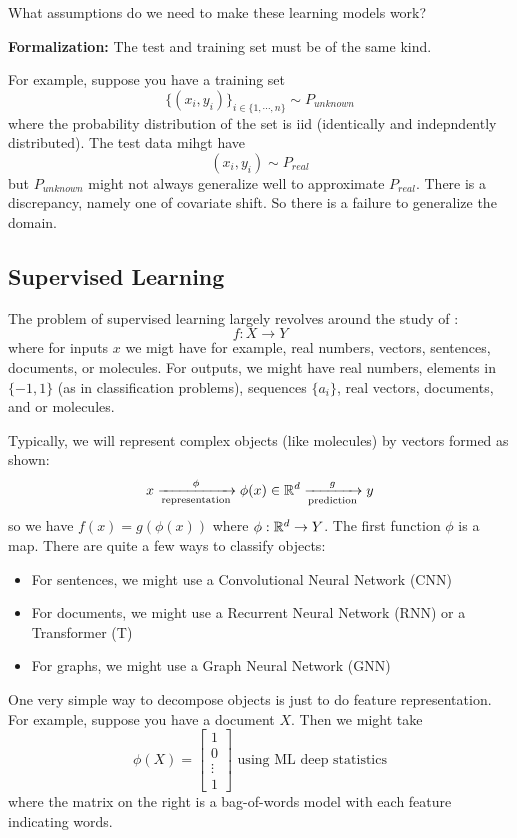 \documentclass[11pt]{scrartcl}
\begin{document}
What assumptions do we need to make these learning models work? 

\textbf{Formalization:} The test and training set must be of the same kind. 

For example, suppose you have a training set $$\{(x_i,y_i)\}_{i \in \{1,\cdots,n\}} \sim P_{unknown}$$ where the probability distribution of the set is iid (identically and indepndently distributed). The test data mihgt have $$(x_i,y_i) \sim P_{real}$$ but $P_{unknown}$ might not always generalize well to approximate $P_{real}$. There is a discrepancy, namely one of covariate shift. So there is a failure to generalize the domain. 

\subsection{Supervised Learning}
The problem of supervised learning largely revolves around the study of : $$f:X \to Y$$ where for inputs $x$ we migt have for example, real numbers, vectors, sentences, documents, or molecules. For outputs, we might have real numbers, elements in $\{-1,1\}$ (as in  classification problems), sequences $\{a_i\}$, real vectors, documents, and or molecules. 

Typically, we will represent complex objects (like molecules) by vectors formed as shown: 
$$x \xrightarrow[\text{representation}]{\phi} \phi(x) \in \mathbb{R}^d \xrightarrow[\text{prediction}]{g} y$$
so we have $f(x)=g(\phi(x))$ where $\phi: \mathbb{R}^d \to Y$. The first function $\phi$ is a  map. There are quite a few ways to classify objects:
\begin{itemize}
    \item For sentences, we might use a Convolutional Neural Network (CNN)
    \item For documents, we might use a Recurrent Neural Network (RNN) or a Transformer (T)
    \item For graphs, we might use a Graph Neural Network (GNN)
\end{itemize}

One very simple way to decompose objects is just to do feature representation. For example, suppose you have a document $X$. Then we might take $$\phi(X)= \begin{bmatrix} 1 \\ 0 \\ \vdots \\ 1 \end{bmatrix} \text{ using ML deep statistics}$$ where the matrix on the right is a bag-of-words model with each feature indicating words.
\end{document}
